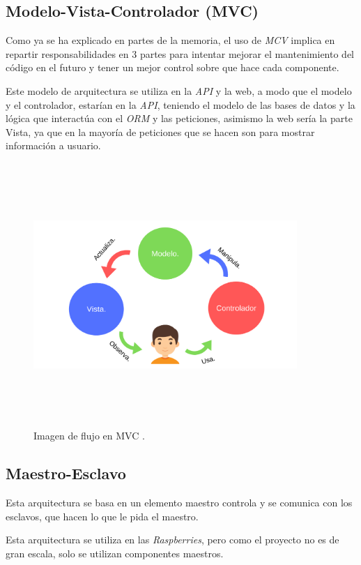 \subsection{Modelo-Vista-Controlador (MVC)}

Como ya se ha explicado en partes de la memoria, el uso de \textit{MCV} implica en repartir responsabilidades en 3 partes para intentar mejorar el mantenimiento del código en el futuro y tener un mejor control sobre que hace cada componente.

Este modelo de arquitectura se utiliza en la \textit{API} y la web, a modo que el modelo y el controlador, estarían en la \textit{API}, teniendo el modelo de las bases de datos y la lógica que interactúa con el \textit{ORM} y las peticiones, asimismo la web sería la parte Vista, ya que en la mayoría de peticiones que se hacen son para mostrar información a usuario.
\FloatBarrier
\begin{figure}[h]
    \centering
    \includegraphics[width=10cm,height=10cm,keepaspectratio]{img/mvc.png}
    \caption{Imagen de flujo en MVC \cite{mvcImag}.}
    \label{fig:mv}
\end{figure}
\FloatBarrier

\subsection{Maestro-Esclavo}

Esta arquitectura se basa en un elemento maestro controla y se comunica con los esclavos, que hacen lo que le pida el maestro.

Esta arquitectura se utiliza en las \textit{Raspberries}, pero como el proyecto no es de gran escala, solo se utilizan componentes maestros.


